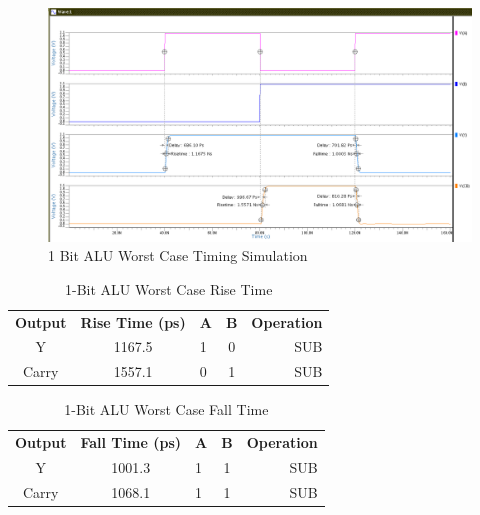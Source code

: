 \documentclass[11pt]{article}
\begin{document}
			\begin{figure}[H]
				\centering
				\includegraphics[width=1\linewidth]{"Pictures/ALU_1Bit Timing"}
				\caption{1 Bit ALU Worst Case Timing Simulation}
				\label{fig:alu1bit-timing}
			\end{figure}
			
			\begin{table}[H]
				\centering
				\caption{1-Bit ALU Worst Case Rise Time}
				\label{tab:ALU-1-Bit-Risetime}
				\begin{tabular}{|cclcr|}
					\hline
					\textbf{Output} & \textbf{Rise Time (ps)} & \textbf{A} & \textbf{B} & \textbf{Operation} \\
					Y               & 1167.5                  & 1          & 0          & SUB                \\
					Carry           & 1557.1                  & 0          & 1          & SUB                \\
					         \hline
				\end{tabular}
			\end{table}
		
		
			\begin{table}[H]
				\centering
				\caption{1-Bit ALU Worst Case Fall Time}
				\label{tab:ALU-1-Bit-Falltime}
				\begin{tabular}{|cclcr|}
					\hline
					\textbf{Output} & \textbf{Fall Time (ps)} & \textbf{A} & \textbf{B} & \textbf{Operation} \\
					Y               & 1001.3                  & 1          & 1          & SUB                \\
					Carry           & 1068.1                  & 1          & 1          & SUB                \\
					\hline
				\end{tabular}
			\end{table}
		
\end{document}
